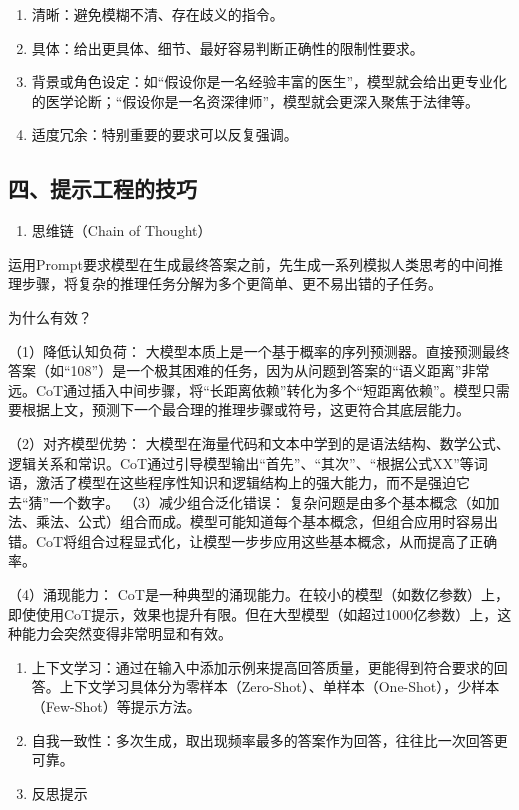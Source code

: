 \begin{enumerate}
\def\labelenumi{\arabic{enumi}.}
\item
  清晰：避免模糊不清、存在歧义的指令。
\item
  具体：给出更具体、细节、最好容易判断正确性的限制性要求。
\item
  背景或角色设定：如``假设你是一名经验丰富的医生''，模型就会给出更专业化的医学论断；``假设你是一名资深律师''，模型就会更深入聚焦于法律等。
\item
  适度冗余：特别重要的要求可以反复强调。
\end{enumerate}

\hypertarget{ux56dbux63d0ux793aux5de5ux7a0bux7684ux6280ux5de7}{%
\subsection{四、提示工程的技巧}\label{ux56dbux63d0ux793aux5de5ux7a0bux7684ux6280ux5de7}}

\begin{enumerate}
\def\labelenumi{\arabic{enumi}.}
\tightlist
\item
  思维链（Chain of Thought）
\end{enumerate}

运用Prompt要求模型在生成最终答案之前，先生成一系列模拟人类思考的中间推理步骤，将复杂的推理任务分解为多个更简单、更不易出错的子任务。

为什么有效？

（1）降低认知负荷： 大模型本质上是一个基于概率的序列预测器。直接预测最终答案（如``108''）是一个极其困难的任务，因为从问题到答案的``语义距离''非常远。CoT通过插入中间步骤，将``长距离依赖''转化为多个``短距离依赖''。模型只需要根据上文，预测下一个最合理的推理步骤或符号，这更符合其底层能力。

（2）对齐模型优势： 大模型在海量代码和文本中学到的是语法结构、数学公式、逻辑关系和常识。CoT通过引导模型输出``首先''、``其次''、``根据公式XX''等词语，激活了模型在这些程序性知识和逻辑结构上的强大能力，而不是强迫它去``猜''一个数字。
（3）减少组合泛化错误： 复杂问题是由多个基本概念（如加法、乘法、公式）组合而成。模型可能知道每个基本概念，但组合应用时容易出错。CoT将组合过程显式化，让模型一步步应用这些基本概念，从而提高了正确率。

（4）涌现能力： CoT是一种典型的涌现能力。在较小的模型（如数亿参数）上，即使使用CoT提示，效果也提升有限。但在大型模型（如超过1000亿参数）上，这种能力会突然变得非常明显和有效。

\begin{enumerate}
\def\labelenumi{\arabic{enumi}.}
\setcounter{enumi}{1}
\item
  上下文学习：通过在输入中添加示例来提高回答质量，更能得到符合要求的回答。上下文学习具体分为零样本（Zero-Shot）、单样本（One-Shot），少样本（Few-Shot）等提示方法。
\item
  自我一致性：多次生成，取出现频率最多的答案作为回答，往往比一次回答更可靠。
\item
  反思提示
\end{enumerate}

